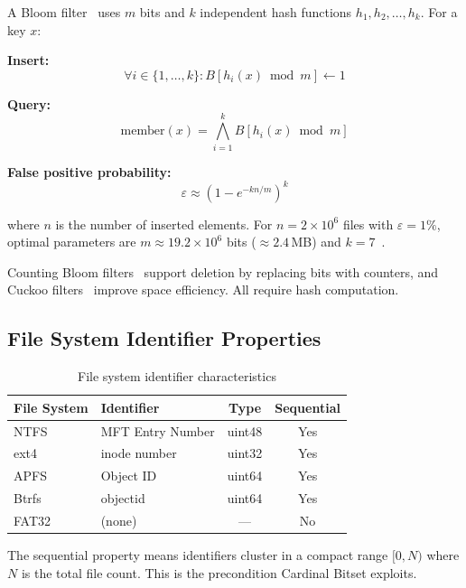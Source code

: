 \documentclass[11pt,twocolumn]{article}
\begin{document}
A Bloom filter~\cite{bloom1970} uses $m$ bits and $k$ independent hash functions $h_1, h_2, \ldots, h_k$. For a key $x$:

\textbf{Insert:}
\begin{equation}
\forall i \in \{1, \ldots, k\}: B[h_i(x) \bmod m] \leftarrow 1
\end{equation}

\textbf{Query:}
\begin{equation}
\text{member}(x) = \bigwedge_{i=1}^{k} B[h_i(x) \bmod m]
\end{equation}

\textbf{False positive probability:}
\begin{equation}
\varepsilon \approx \left(1 - e^{-kn/m}\right)^k
\end{equation}

where $n$ is the number of inserted elements. For $n = 2 \times 10^6$ files with $\varepsilon = 1\%$, optimal parameters are $m \approx 19.2 \times 10^6$ bits ($\approx 2.4$\,MB) and $k = 7$~\cite{fan2000}.

Counting Bloom filters~\cite{fan2000} support deletion by replacing bits with counters, and Cuckoo filters~\cite{fan2014} improve space efficiency. All require hash computation.

\subsection{File System Identifier Properties}

\begin{table}[h]
\centering
\caption{File system identifier characteristics}
\label{tab:fsids}
\begin{tabular}{@{}llcc@{}}
\toprule
File System & Identifier & Type & Sequential \\
\midrule
NTFS & MFT Entry Number & uint48 & Yes \\
ext4 & inode number & uint32 & Yes \\
APFS & Object ID & uint64 & Yes \\
Btrfs & objectid & uint64 & Yes \\
FAT32 & (none) & --- & No \\
\bottomrule
\end{tabular}
\end{table}

The sequential property means identifiers cluster in a compact range $[0, N)$ where $N$ is the total file count. This is the precondition Cardinal Bitset exploits.
\end{document}
